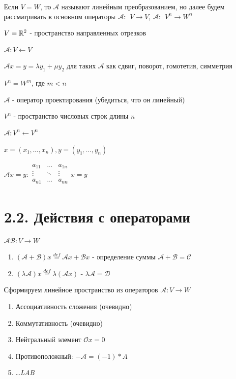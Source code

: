 \documentclass[12pt]{article}
\begin{document}
    \Nota Если $V = W$, то $\mathcal{A}$ называют линейным преобразованием, но далее будем рассматривать в основном операторы $\mathcal{A}: \ \ V \rightarrow V$, $\displaystyle \mathcal{A}: \ \ V^n \rightarrow W^n$



     $\displaystyle V = \mathbb{R}^2$ - пространство направленных отрезков

    $\mathcal{A}: V \leftarrow V$

    $\displaystyle \mathcal{A}x = y = \lambda y_1 + \mu y_2$ для таких $\mathcal{A}$ как сдвиг, поворот, гомотетия, симметрия

     $\displaystyle V^n = W^m$, где $m < n$

    $\mathcal{A}$ - оператор проектирования (убедиться, что он линейный)

     $\displaystyle V^n$ - пространство числовых строк длины $n$

    $\displaystyle \mathcal{A}: V^n \leftarrow V^n$

    $\displaystyle x = (x_1, \dots, x_n), y = (y_1, \dots, y_n)$

    $\displaystyle \mathcal{A}x = y : \begin{array}{|ccc|}
    a_{11} & \ldots & a_{1n}\\
    \vdots & \ddots & \vdots\\
    a_{n1} & \ldots & a_{nn}\\
    \end{array}x = y$


    \section{2.2. Действия с операторами}

    \Def $\mathcal{A}\mathcal{B}: V \rightarrow W$

    \begin{enumerate}
        \item $(\mathcal{A} + \mathcal{B})x \stackrel{def}{=} \mathcal{A}x + \mathcal{B}x$ - определение суммы $\mathcal{A} + \mathcal{B} = \mathcal{C}$
        \item $(\lambda\mathcal{A})x \stackrel{def}{=} \lambda(\mathcal{A}x)$ - $\lambda\mathcal{A} = \mathcal{D}$
    \end{enumerate}

    \Nota Сформируем линейное пространство из операторов $\mathcal{A}: V \rightarrow W$

    \begin{enumerate}
        \item Ассоциативность сложения (очевидно)
        \item Коммутативность (очевидно)
        \item Нейтральный элемент $\mathcal{O}x = 0$
        \item Противоположный: $-\mathcal{A} = (-1) * A$
        \item \dots \textit{LAB}
    \end{enumerate}
\end{document}
